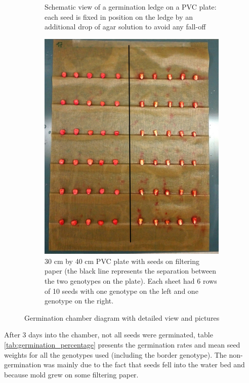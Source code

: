 \begin{figure}[!htb]
\begin{subfigure}[b]{0.475\textwidth}
            {Schematic view of a germination ledge on a PVC plate: each seed is fixed in position on the ledge by an additional 
            drop of agar solution to avoid any fall-off}    
            \label{fig:germiantion_ledge}
        \end{subfigure}
        \quad
        \begin{subfigure}[b]{0.475\textwidth}   
            \centering 
            \includegraphics[width=\textwidth]{figures/photo_germination_plate.jpg}
            \caption[]%
            {30 cm by 40 cm PVC plate with seeds on filtering paper (the black line represents the separation between the two 
           genotypes on the plate). Each sheet had 6 rows of 10 seeds with one genotype on the left and one genotype on the 
           right.}    
            \label{fig:photo_germination_plate}
        \end{subfigure}
        \caption{Germination chamber diagram with detailed view and pictures}
    \end{figure}

After 3 days into the chamber, not all seeds were germinated, table \ref{tab:germination_percentage} presents the germination 
rates and mean seed weights for all the genotypes used (including the border genotype). The non-germination was mainly due to 
the fact that seeds fell into the water bed and because mold grew on some filtering paper.

